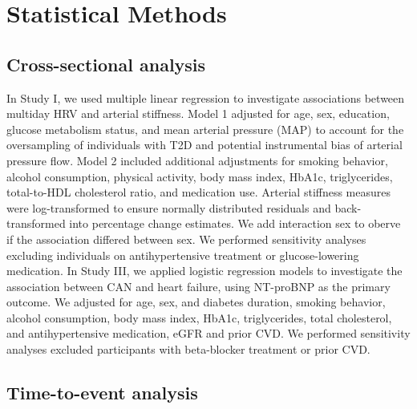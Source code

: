 \documentclass[
  a4paper,
  headsepline=true,
  open=any]{scrbook}
\begin{document}
\hypertarget{statistical-methods}{%
\section{Statistical Methods}\label{statistical-methods}}

\hypertarget{cross-sectional-analysis}{%
\subsection{Cross-sectional analysis}\label{cross-sectional-analysis}}

In Study I, we used multiple linear regression to investigate
associations between multiday HRV and arterial stiffness. Model 1
adjusted for age, sex, education, glucose metabolism status, and mean
arterial pressure (MAP) to account for the oversampling of individuals
with T2D and potential instrumental bias of arterial pressure flow.
Model 2 included additional adjustments for smoking behavior, alcohol
consumption, physical activity, body mass index, HbA1c, triglycerides,
total-to-HDL cholesterol ratio, and medication use. Arterial stiffness
measures were log-transformed to ensure normally distributed residuals
and back-transformed into percentage change estimates. We add
interaction sex to oberve if the association differed between sex. We
performed sensitivity analyses excluding individuals on antihypertensive
treatment or glucose-lowering medication. In Study III, we applied
logistic regression models to investigate the association between CAN
and heart failure, using NT-proBNP as the primary outcome. We adjusted
for age, sex, and diabetes duration, smoking behavior, alcohol
consumption, body mass index, HbA1c, triglycerides, total cholesterol,
and antihypertensive medication, eGFR and prior CVD. We performed
sensitivity analyses excluded participants with beta-blocker treatment
or prior CVD.

\hypertarget{time-to-event-analysis}{%
\subsection{Time-to-event analysis}\label{time-to-event-analysis}}
\end{document}

